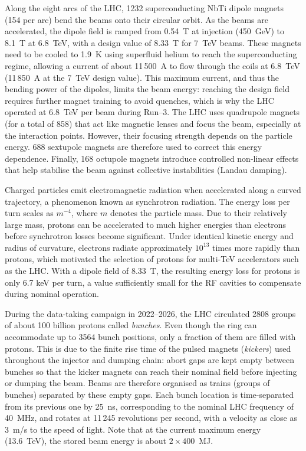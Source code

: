 Along the eight arcs of the LHC, 1232 superconducting NbTi dipole magnets (154 per arc) bend the beams onto their circular orbit. As the beams are accelerated, the dipole field is ramped from 0.54~T at injection (450~GeV) to 8.1~T at 6.8~TeV, with a design value of 8.33~T for 7~TeV beams. These magnets need to be cooled to 1.9~K using superfluid helium to reach the superconducting regime, allowing a current of about 11\,500~A to flow through the coils at 6.8~TeV (11\,850~A at the 7~TeV design value). This maximum current, and thus the bending power of the dipoles, limits the beam energy: reaching the design field requires further magnet training to avoid quenches, which is why the LHC operated at 6.8~TeV per beam during Run--3. The LHC uses quadrupole magnets (for a total of 858) that act like magnetic lenses and focus the beam, especially at the interaction points. However, their focusing strength depends on the particle energy. 688 sextupole magnets are therefore used to correct this energy dependence. Finally, 168 octupole magnets introduce controlled non-linear effects that help stabilise the beam against collective instabilities (Landau damping).

Charged particles emit electromagnetic radiation when accelerated along a curved trajectory, a phenomenon known as synchrotron radiation. The energy loss per turn scales as $m^{-4}$, where $m$ denotes the particle mass. Due to their relatively large mass, protons can be accelerated to much higher energies than electrons before synchrotron losses become significant. Under identical kinetic energy and radius of curvature, electrons radiate approximately $10^{13}$ times more rapidly than protons, which motivated the selection of protons for multi-TeV accelerators such as the LHC. With a dipole field of 8.33~T, the resulting energy loss for protons is only 6.7 keV per turn, a value sufficiently small for the RF cavities to compensate during nominal operation.

\vspace{0.5 cm}

During the data-taking campaign in 2022--2026, the LHC circulated 2808 groups of about 100 billion protons called \textit{bunches}. Even though the ring can accommodate up to 3564 bunch positions, only a fraction of them are filled with protons. This is due to the finite rise time of the pulsed magnets (\textit{kickers}) used throughout the injector and dumping chain: abort gaps are kept empty between bunches so that the kicker magnets can reach their nominal field before injecting or dumping the beam. Beams are therefore organised as trains (groups of bunches) separated by these empty gaps. Each bunch location is time-separated from its previous one by 25~ns, corresponding to the nominal LHC frequency of 40~MHz, and rotates at 11\,245 revolutions per second, with a velocity as close as 3~m/s to the speed of light. Note that at the current maximum energy (13.6~TeV), the stored beam energy is about $2\times400$~MJ.

